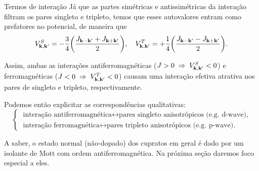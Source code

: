 \documentclass[a4paper,10pt]{article}
\begin{document}
\begin{section}{Termos de interação}
Já que as partes simétricas e antissimétricas da interação filtram os pares singleto e tripleto, temos que esses autovalores entram como prefatores no potencial, de maneira que
$$
V_{\vb{k},\vb{k}'}^S = -\frac{3}{4} \qty(\frac{J_{\vb{k}-\vb{k}'} + J_{\vb{k}+\vb{k}'}}{2}), \quad
V_{\vb{k},\vb{k}'}^T = +\frac{1}{4} \qty(\frac{J_{\vb{k}-\vb{k}'} - J_{\vb{k}+\vb{k}'}}{2}).
$$

Assim, ambas as interações antiferromagnéticas ($J > 0 \; \Rightarrow \; V_{\vb{k},\vb{k}'}^S < 0$) e ferromagnéticas ($J < 0 \; \Rightarrow \; V_{\vb{k},\vb{k}'}^T < 0$) causam uma interação efetiva atrativa nos pares de singleto e tripleto, respectivamente.

Podemos então explicitar as correspondências qualitativas:
$$
\begin{cases}
\; \text{interação antiferromagnética} \leftrightarrow \text{pares singleto anisotrópicos (e.g. d-wave),} \\
\; \text{interação ferromagnética} \leftrightarrow \text{pares tripleto anisotrópicos (e.g. p-wave).}
\end{cases}
$$

A saber, o estado normal (não-dopado) dos cupratos em geral é dado por um isolante de Mott com ordem antiferromagnética. Na próxima seção daremos foco especial a eles.

\end{section}

\end{document}
